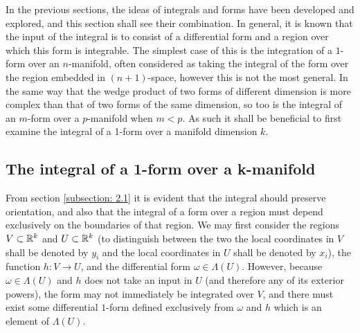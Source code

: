 \documentclass[.../main.tex]{subfiles}
\begin{document}
	
In the previous sections, the ideas of integrals and forms have been developed and explored, and this section shall see their combination. In general, it is known that the input of the integral is to consist of a differential form and a region over which this form is integrable. The simplest case of this is the integration of a $1$-form over an $n$-manifold, often considered as taking the integral of the form over the region embedded in $(n+1)$-space, however this is not the most general. In the same way that the wedge product of two forms of different dimension is more complex than that of two forms of the same dimension, so too is the integral of an $m$-form over a $p$-manifold when $m<p$. As such it shall be beneficial to first examine the integral of a 1-form over a manifold dimension $k$.

\subsection{The integral of a 1-form over a k-manifold}
From section \ref{subsection: 2.1} it is evident that the integral should preserve orientation, and also that the integral of a form over a region must depend exclusively on the boundaries of that region. We may first consider the regions $V \subset \mathbb{R}^{k}$ and $U \subset \mathbb{R}^{k}$ (to distinguish between the two the local coordinates in $V$ shall be denoted by $y_i$ and the local coordinates in $U$ shall be denoted by $x_i$), the function $h: V \rightarrow U$, and the differential form $\omega \in \Lambda(U)$. However, because $\omega \in \Lambda(U)$ and $h$ does not take an input in $U$ (and therefore any of its exterior powers), the form may not immediately be integrated over $V$, and there must exist some differential $1$-form defined exclusively from $\omega$ and $h$ which is an element of $\Lambda(U)$.



\end{document}
